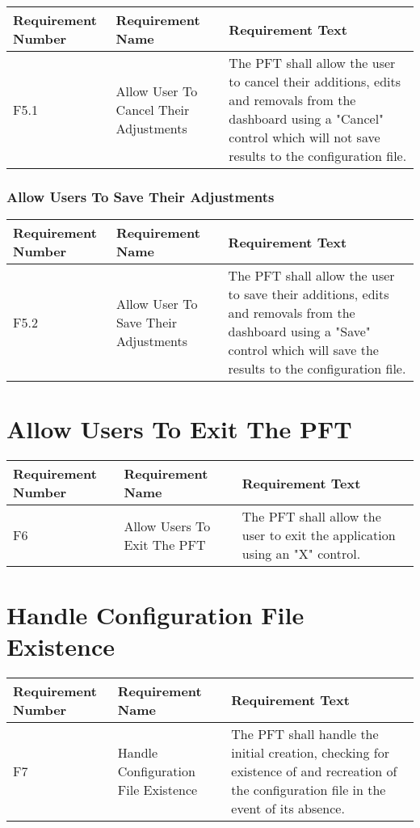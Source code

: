 \documentclass{article}
\begin{document}
\begin{longtable}{|p{2cm}|p{6cm}| p{6cm}|}
    \hline
    \textbf{Requirement Number} & \textbf{Requirement Name} & \textbf{Requirement Text}\\
    \hline
    F5.1 & Allow User To Cancel Their Adjustments & The PFT shall allow the user to cancel their additions, edits and removals from the dashboard using a "Cancel" control which will not save results to the configuration file.  \\
    \hline
\end{longtable}

\subsubsection{Allow Users To Save Their Adjustments}

\begin{longtable}{|p{2cm}|p{6cm}| p{6cm}|}
    \hline
    \textbf{Requirement Number} & \textbf{Requirement Name} & \textbf{Requirement Text}\\
    \hline
    F5.2 & Allow User To Save Their Adjustments & The PFT shall allow the user to save their additions, edits and removals from the dashboard using a "Save" control which will save the results to the configuration file.  \\
    \hline
\end{longtable}

\section{Allow Users To Exit The PFT}

\begin{longtable}{|p{2cm}|p{6cm}| p{6cm}|}
    \hline
    \textbf{Requirement Number} & \textbf{Requirement Name} & \textbf{Requirement Text}\\
    \hline
    F6& Allow Users To Exit The PFT & The PFT shall allow the user to exit the application using an "X" control.  \\
    \hline
\end{longtable}

\section{Handle Configuration File Existence}

\begin{longtable}{|p{2cm}|p{6cm}| p{6cm}|}
    \hline
    \textbf{Requirement Number} & \textbf{Requirement Name} & \textbf{Requirement Text}\\
    \hline
    F7& Handle Configuration File Existence & The PFT shall handle the initial creation, checking for existence of and recreation of the configuration file in the event of its absence.  \\
    \hline
\end{longtable}
\end{document}
